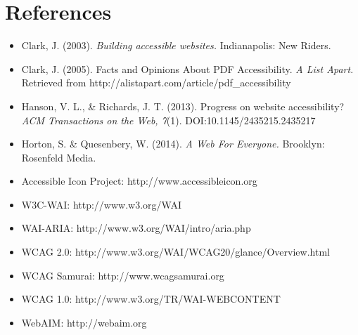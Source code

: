 \documentclass{acm_proc_article-sp}
\begin{document}
\section{References}
\begin{itemize}
\item Clark, J. (2003). {\it Building accessible websites.} Indianapolis: New Riders.
\item Clark, J. (2005). Facts and Opinions About PDF Accessibility. {\it A List Apart}. Retrieved from http://alistapart.com/article/pdf\_accessibility
\item Hanson, V. L., \& Richards, J. T. (2013). Progress on website accessibility? {\it ACM Transactions on the Web, 7}(1). DOI:10.1145/2435215.2435217
\item Horton, S. \& Quesenbery, W. (2014). {\it A Web For Everyone.} Brooklyn: Rosenfeld Media.
\item Accessible Icon Project: http://www.accessibleicon.org
\item W3C-WAI: http://www.w3.org/WAI
\item WAI-ARIA: http://www.w3.org/WAI/intro/aria.php
\item WCAG 2.0: http://www.w3.org/WAI/WCAG20/glance/Overview.html
\item WCAG Samurai: http://www.wcagsamurai.org
\item WCAG 1.0: http://www.w3.org/TR/WAI-WEBCONTENT
\item WebAIM: http://webaim.org		
\end{itemize}
%
\end{document}

